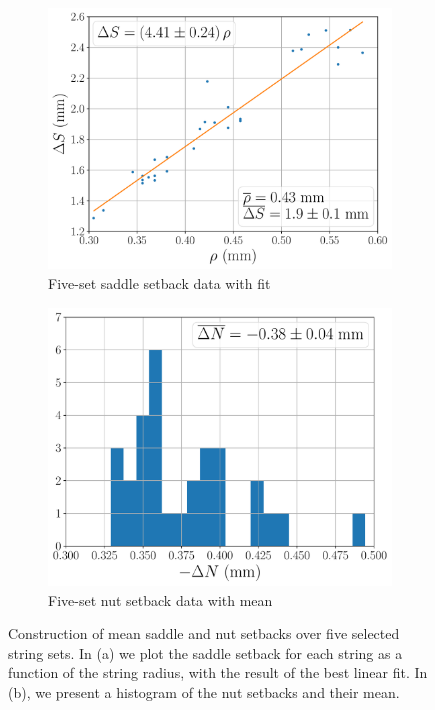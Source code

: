 \begin{figure}
  \centering
  \begin{subfigure}[b]{0.8\textwidth}
   \centering
   \includegraphics[width=5.0in]{../figures/fit_ds}
   \caption{Five-set saddle setback data with fit}
   \label{fig:fit_ds}
  \end{subfigure}
  \par\vspace{0.25in}
  \begin{subfigure}[b]{0.8\textwidth}
   \centering
   \includegraphics[width=5.0in]{../figures/hist_dn}
   \caption{Five-set nut setback data with mean}
   \label{fig:hist_dn}
  \end{subfigure}
  \caption{\label{fig:dsdn_mean} Construction of mean saddle and nut setbacks over five selected string sets. In (a) we plot the saddle setback for each string as a function of the string radius, with the result of the best linear fit. In (b), we present a histogram of the nut setbacks and their mean.}
 \end{figure}

